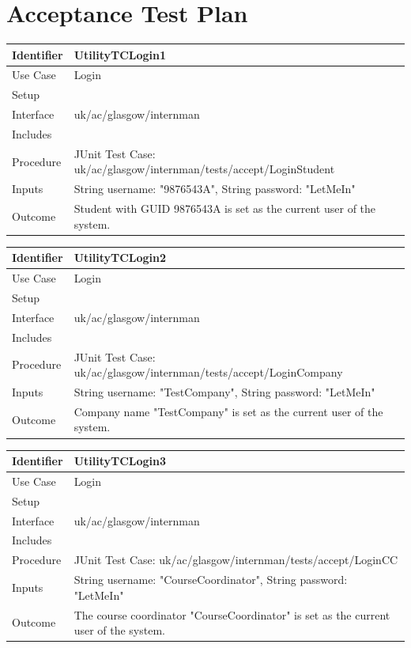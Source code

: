 \documentclass[11pt]{article}
\begin{document}
\newpage

\section{Acceptance Test Plan}

\begin{tabularx}{\textwidth}{|T|L|}
\hline
Identifier & UtilityTCLogin1\\
\hline
Use Case & Login\\
\hline
Setup &\\
\hline
Interface & uk/ac/glasgow/internman\\
\hline
Includes &\\
\hline
Procedure & JUnit Test Case: uk/ac/glasgow/internman/tests/accept/LoginStudent\\
\hline
Inputs & String username: "9876543A", String password: "LetMeIn"\\
\hline
Outcome & Student with GUID 9876543A is set as the current user of the system.\\
\hline
\end{tabularx}

\vspace{2em}

\begin{tabularx}{\textwidth}{|T|L|}
\hline
Identifier & UtilityTCLogin2\\
\hline
Use Case & Login\\
\hline
Setup &\\
\hline
Interface & uk/ac/glasgow/internman\\
\hline
Includes &\\
\hline
Procedure & JUnit Test Case: uk/ac/glasgow/internman/tests/accept/LoginCompany\\
\hline
Inputs & String username: "TestCompany", String password: "LetMeIn"\\
\hline
Outcome & Company name "TestCompany" is set as the current user of the system.\\
\hline
\end{tabularx}

\vspace{2em}

\begin{tabularx}{\textwidth}{|T|L|}
\hline
Identifier & UtilityTCLogin3\\
\hline
Use Case & Login\\
\hline
Setup &\\
\hline
Interface & uk/ac/glasgow/internman\\
\hline
Includes &\\
\hline
Procedure & JUnit Test Case: uk/ac/glasgow/internman/tests/accept/LoginCC\\
\hline
Inputs & String username: "CourseCoordinator", String password: "LetMeIn"\\
\hline
Outcome & The course coordinator "CourseCoordinator" is set as the current user 
of the system.\\
\hline
\end{tabularx}
\end{document}
